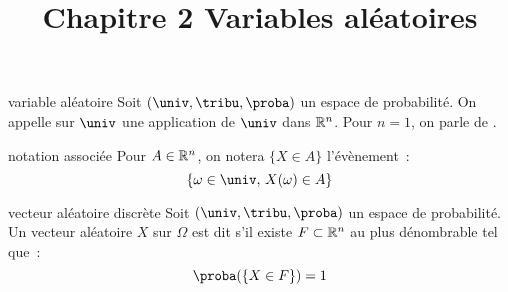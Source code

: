 

\setcounter{chapitre}{2}

\title{\Large Chapitre 2 \newline \Huge Variables aléatoires}



\maketitle

\begin{definition}{}{variable aléatoire}
    Soit $(\univ, \tribu, \proba)$ un espace de probabilité. On appelle  sur $\univ$ une application de $\univ$ dans $\mathbb{R}^n$.
    Pour $n=1$, on parle de .
\end{definition}

\begin{remarque}{}{notation associée}
    Pour $A \in \mathbb{R}^n$, on notera $\{X \in A\}$ l'évènement~:
    $$\{\omega \in \univ,\, X(\omega) \in A\}$$
\end{remarque}

\begin{definition}{}{vecteur aléatoire discrète}
    Soit $(\univ, \tribu, \proba)$ un espace de probabilité. Un vecteur aléatoire $X$ sur $\Omega$ est dit  s'il existe $F \subset \mathbb{R}^n$ au plus dénombrable tel que~:
    $$\proba(\{X \in F\}) = 1$$
    
\end{definition}


